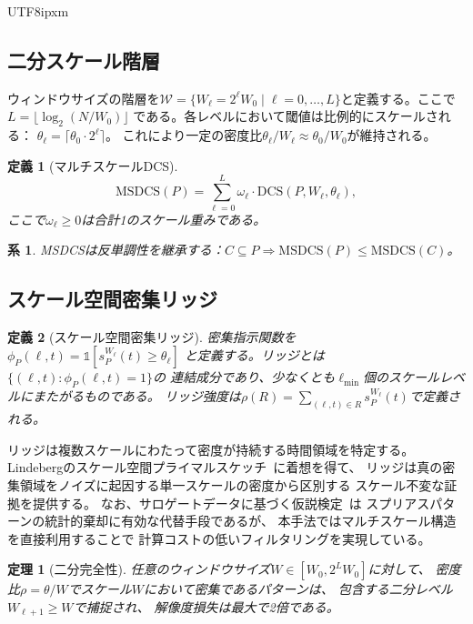 \documentclass[conference]{IEEEtran}
\newtheorem{theorem}{定理}
\newtheorem{definition}{定義}
\newtheorem{corollary}{系}
\begin{document}
\begin{CJK}{UTF8}{ipxm}
\subsection{二分スケール階層}

ウィンドウサイズの階層を$\mathcal{W} = \{W_\ell = 2^\ell W_0
\mid \ell = 0, \ldots, L\}$と定義する。ここで$L = \lfloor \log_2(N/W_0) \rfloor$
である。各レベルにおいて閾値は比例的にスケールされる：
$\theta_\ell = \lceil \theta_0 \cdot 2^\ell \rceil$。
これにより一定の密度比$\theta_\ell / W_\ell \approx \theta_0 / W_0$が維持される。

\begin{definition}[マルチスケールDCS]
\begin{equation}
\mathrm{MSDCS}(P) = \sum_{\ell=0}^{L} \omega_\ell \cdot \mathrm{DCS}(P, W_\ell, \theta_\ell),
\end{equation}
ここで$\omega_\ell \geq 0$は合計1のスケール重みである。
\end{definition}

\begin{corollary}\label{cor:ms}
MSDCSは反単調性を継承する：$C \subseteq P \Rightarrow
\mathrm{MSDCS}(P) \leq \mathrm{MSDCS}(C)$。
\end{corollary}

\subsection{スケール空間密集リッジ}

\begin{definition}[スケール空間密集リッジ]
密集指示関数を$\phi_P(\ell, t) = \mathbb{1}[s_P^{W_\ell}(t) \geq \theta_\ell]$
と定義する。\emph{リッジ}とは$\{(\ell, t) : \phi_P(\ell, t) = 1\}$の
連結成分であり、少なくとも$\ell_{\min}$個のスケールレベルにまたがるものである。
リッジ強度は$\rho(R) = \sum_{(\ell,t) \in R} s_P^{W_\ell}(t)$で定義される。
\end{definition}

リッジは複数スケールにわたって密度が持続する時間領域を特定する。
Lindebergのスケール空間プライマルスケッチ~\cite{lindeberg1993blob}に着想を得て、
リッジは真の密集領域をノイズに起因する単一スケールの密度から区別する
スケール不変な証拠を提供する。
なお、サロゲートデータに基づく仮説検定~\cite{lancaster2018surrogate}は
スプリアスパターンの統計的棄却に有効な代替手段であるが、
本手法ではマルチスケール構造を直接利用することで
計算コストの低いフィルタリングを実現している。

\begin{theorem}[二分完全性]\label{thm:dyadic}
任意のウィンドウサイズ$W \in [W_0, 2^L W_0]$に対して、
密度比$\rho = \theta/W$でスケール$W$において密集であるパターンは、
包含する二分レベル$W_{\ell+1} \geq W$で捕捉され、
解像度損失は最大で2倍である。
\end{theorem}


\end{CJK}
\end{document}
